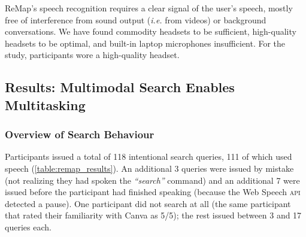 ReMap's speech recognition requires a clear signal of the user's speech, mostly free of interference from sound output (\textit{i.e.} from videos) or background conversations. We have found commodity headsets to be sufficient, high-quality headsets to be optimal, and built-in laptop microphones insufficient. For the study, participants wore a high-quality headset.

\subsection{Results: Multimodal Search Enables Multitasking}
\subsubsection{Overview of Search Behaviour}
Participants issued a total of 118 intentional search queries, 111 of which used speech (\autoref{table:remap_results}). An additional 3 queries were issued by mistake (not realizing they had spoken the \textit{``search''} command) and an additional 7 were issued before the participant had finished speaking (because the Web Speech \textsc{api} detected a pause). One participant did not search at all (the same participant that rated their familiarity with Canva as 5/5); the rest issued between 3 and 17 queries each. 

